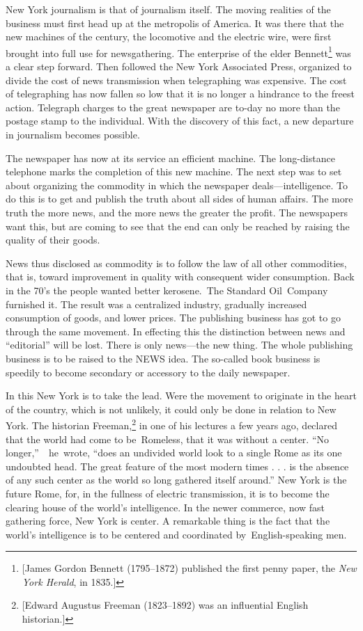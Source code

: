 \documentclass[twoside,symmetric,nobib,justified]{tufte-book}
\begin{document}
 New York journalism is that of journalism itself. The
moving realities of the business must first head up at the metropolis of
America. It was there that the new machines of the century, the
locomotive and the electric wire, were first brought into full use for
newsgathering. The enterprise of the elder Bennett\footnote{{[}James
  Gordon Bennett (1795--1872) published the first penny paper, the
  \emph{New York Herald}, in 1835.{]}} was a clear step forward. Then
followed the New York Associated Press, organized to divide the cost of
news transmission when telegraphing was expensive. The cost of
telegraphing has now fallen so low that it is no longer a hindrance to
the freest action. Telegraph charges to the great newspaper are to-day
no more than the postage stamp to the individual. With the discovery of
this fact, a new departure in journalism becomes possible.~

The newspaper has now at its service an efficient machine. The
long-distance telephone marks the completion of this new machine. The
next step was to set about organizing the commodity in which the
newspaper deals---intelligence. To do this is to get and publish the
truth about all sides of human affairs. The more truth the more news,
and the more news the greater the profit. The newspapers want this, but
are coming to see that the end can only be reached by raising the
quality of their goods.~

News thus disclosed as commodity is to follow the law of all other
commodities, that is, toward improvement in quality with consequent
wider consumption. Back in the 70's the people wanted better
kerosene.~The Standard Oil~Company furnished it. The result was a
centralized industry, gradually increased consumption of goods, and
lower prices. The publishing business has got to go through the same
movement. In effecting this the distinction between news and
``editorial'' will be lost. There is only news---the new thing. The
whole publishing business is to be raised to the NEWS idea. The
so-called book business is speedily to become secondary or accessory to
the daily newspaper.~

In this New York is to take the lead. Were the movement to originate in
the heart of the country, which is not unlikely, it could only be done
in relation to New York. The historian Freeman,\footnote{{[}Edward
  Augustus Freeman (1823--1892) was an influential English historian.{]}}
in one of his lectures a few years ago, declared that the world had come
to be~Romeless, that it was without a center. ``No
longer,''~~he~wrote, ``does an undivided world look to a single Rome as
its one undoubted head. The great feature of the most modern times . . .
is the absence of any such center as the world so long gathered itself
around.'' New York is the future Rome, for, in the fullness of electric
transmission, it is to become the clearing house of the world's
intelligence. In the newer commerce, now fast gathering force, New York
is center. A remarkable thing is the fact that the world's intelligence
is to be centered and coordinated by~English-speaking men.~
\end{document}
